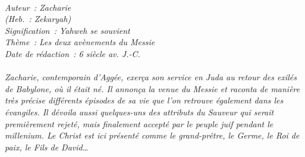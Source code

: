 \BFont
\noindent\hrulefill
{\footnotesize
\textit{
\bigskip
{\centering{}
\\Auteur~: Zacharie
\\(Heb.~: Zekaryah)
\\Signification~: Yahweh se souvient
\\Thème~: Les deux avènements du Messie
\\Date de rédaction~: 6 siècle av. J.-C.\\}
}
\textit{
\\Zacharie, contemporain d'Aggée, exerça son service en Juda au retour des exilés de Babylone, où il était né. Il annonça la venue du Messie et raconta de manière très précise différents épisodes de sa vie que l'on retrouve également dans les évangiles. Il dévoila aussi quelques-uns des attributs du Sauveur qui serait premièrement rejeté, mais finalement accepté par le peuple juif pendant le millenium. Le Christ est ici présenté comme le grand-prêtre, le Germe, le Roi de paix, le Fils de David…\bigskip
}
}
\par\nobreak\noindent\hrulefill
